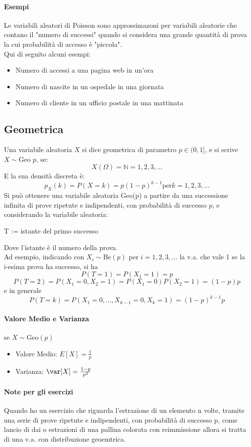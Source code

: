 \paragraph{Esempi}
Le variabili aleatori di Poisson sono approssimazoni per variabili aleatorie che contano il "numero di successi"
quando si considera una grande quantità di prova la cui probabilità di accesso è "piccola".
\\ Qui di seguito alcuni esempi: 
\begin{itemize}
    \item Numero di accessi a una pagina web in un'ora
    \item Numero di nascite in un ospedale in una giornata
    \item Numero di cliente in un ufficio postale in una mattinata
\end{itemize}

\subsection{Geometrica}
Una variabile aleatoria $X$ si dice geometrica di parametro $p \in (0,1]$, e si scrive 
$X \sim \text{Geo }p$, se:
\[X(\Omega)=\mathbb{N} = {1,2,3,\dots}\]
E la sua densità discreta è:
\[
    p_X (k) = P(X = k) = p(1-p)^{k-1} \text{per} k=1,2,3,\dots
\]
Si può ottenere una variabile aleatoria Geo(p) a partire da una successione infinita di prove ripetute
e indipendenti, con probabilità di successo $p$, e considerando la variabile aleatoria:
\begin{center}
    T := istante del primo successo
\end{center}
Dove l'istante è il numero della prova.
\\ Ad esempio, indicando con $X_i \sim \text{Be}(p)$ per $i=1,2,3,\dots$ la v.a. che vale 1
se la i-esima prova ha successo, si ha
\[
    P(T=1) = P(X_1 = 1) = p
\]
\[
    P(T=2) = P(X_1 = 0, X_2 = 1) = P(X_1 = 0)P(X_2 = 1) = (1-p)p
\]
e in generale
\[
    P(T=k) = P(X_1=0, \dots, X_{k-1} = 0, X_k = 1) = (1-p)^{k-1}p
\]
\paragraph*{Valore Medio e Varianza} se $X\sim \text{Geo}(p)$
\begin{itemize}
    \item Valore Medio: $E[X] = \frac{1}{p}$
    \item Varianza: $\var[X] = \frac{1-p}{p^2}$
\end{itemize}
\paragraph*{Note per gli esercizi}
Quando ho un esercizio che riguarda l'estrazione di un elemento n volte, tramite una serie
di prove ripetute e indipendenti, con probabilità di successo p, come lancio di dai o
estrazioni di una pallina colorata con reimmissione allora si tratta di una v.a. con
distribuzione geoemtrica.


